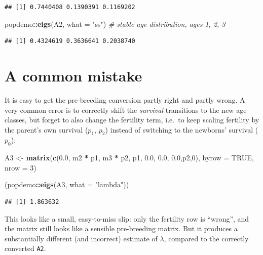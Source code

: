 \documentclass[
  a4paper]{book}
\newenvironment{Shaded}{\begin{snugshade}}{\end{snugshade}}
\newcommand{\AttributeTok}[1]{\textcolor[rgb]{0.13,0.29,0.53}{#1}}
\newcommand{\CommentTok}[1]{\textcolor[rgb]{0.56,0.35,0.01}{\textit{#1}}}
\newcommand{\ConstantTok}[1]{\textcolor[rgb]{0.56,0.35,0.01}{#1}}
\newcommand{\DecValTok}[1]{\textcolor[rgb]{0.00,0.00,0.81}{#1}}
\newcommand{\FloatTok}[1]{\textcolor[rgb]{0.00,0.00,0.81}{#1}}
\newcommand{\FunctionTok}[1]{\textcolor[rgb]{0.13,0.29,0.53}{\textbf{#1}}}
\newcommand{\NormalTok}[1]{#1}
\newcommand{\OtherTok}[1]{\textcolor[rgb]{0.56,0.35,0.01}{#1}}
\newcommand{\SpecialCharTok}[1]{\textcolor[rgb]{0.81,0.36,0.00}{\textbf{#1}}}
\newcommand{\StringTok}[1]{\textcolor[rgb]{0.31,0.60,0.02}{#1}}
\begin{document}
\begin{verbatim}
## [1] 0.7440408 0.1390391 0.1169202
\end{verbatim}

\begin{Shaded}
\begin{Highlighting}[]
\NormalTok{popdemo}\SpecialCharTok{::}\FunctionTok{eigs}\NormalTok{(A2, }\AttributeTok{what =} \StringTok{"ss"}\NormalTok{) }\CommentTok{\# stable age distribution, ages 1, 2, 3}
\end{Highlighting}
\end{Shaded}

\begin{verbatim}
## [1] 0.4324619 0.3636641 0.2038740
\end{verbatim}

\section{A common mistake}\label{a-common-mistake}

It is easy to get the pre-breeding conversion partly right and partly wrong. A very common error is to correctly shift the \emph{survival} transitions to the new age classes, but forget to also change the fertility term, i.e.~to keep scaling fertility by the parent's own survival (\(p_1\), \(p_2\)) instead of switching to the newborns' survival (\(p_0\)):

\begin{Shaded}
\begin{Highlighting}[]
\NormalTok{A3 }\OtherTok{\textless{}{-}} \FunctionTok{matrix}\NormalTok{(}\FunctionTok{c}\NormalTok{(}\FloatTok{0.0}\NormalTok{, m2 }\SpecialCharTok{*}\NormalTok{ p1, m3 }\SpecialCharTok{*}\NormalTok{ p2,}
\NormalTok{               p1, }\FloatTok{0.0}\NormalTok{, }\FloatTok{0.0}\NormalTok{,}
               \FloatTok{0.0}\NormalTok{,p2,}\DecValTok{0}\NormalTok{), }\AttributeTok{byrow =} \ConstantTok{TRUE}\NormalTok{, }\AttributeTok{nrow =} \DecValTok{3}\NormalTok{)}

\NormalTok{(popdemo}\SpecialCharTok{::}\FunctionTok{eigs}\NormalTok{(A3, }\AttributeTok{what =} \StringTok{"lambda"}\NormalTok{))}
\end{Highlighting}
\end{Shaded}

\begin{verbatim}
## [1] 1.863632
\end{verbatim}

This looks like a small, easy-to-miss slip: only the fertility row is ``wrong'', and the matrix still looks like a sensible pre-breeding matrix. But it produces a substantially different (and incorrect) estimate of \(\lambda\), compared to the correctly converted \texttt{A2}.
\end{document}
